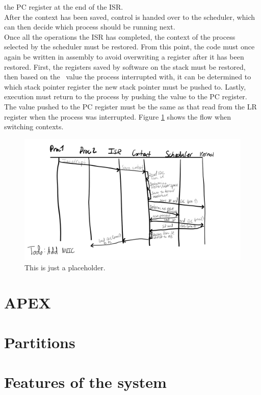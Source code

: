 the PC register at the end of the ISR.\\
After the context has been saved, control is handed over to the scheduler, which
can then decide which process should be running next.\\
Once all the operations the ISR has completed, the context of the process
selected by the scheduler must be restored. From this point, the code must once
again be written in assembly to avoid overwriting a register after it has been 
restored. First, the registers saved by software on the stack must be restored,
then based on the \excreturn\ value the process interrupted with, it can be 
determined to which stack pointer register the new stack pointer must be pushed
to. Lastly, execution must return to the process by pushing the \excreturn value
to the PC register. The \excreturn value pushed to the PC register must be the
same as that read from the LR register when the process was interrupted.
Figure \ref{fig:flowchart_contextswitch} shows the flow when switching contexts.
\begin{figure}
    \includegraphics[width=\textwidth]{figures/flowchart_contextswitch.png}
    \caption{This is just a placeholder.}
    \label{fig:flowchart_contextswitch}
\end{figure}

\section{APEX}

\section{Partitions}

\section{Features of the system}
